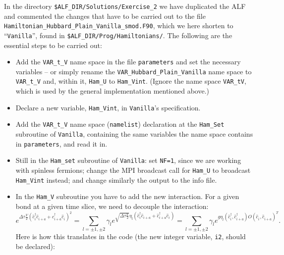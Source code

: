 \documentclass[10pt,modern]{scrartcl}
\numberwithin{exerciseitem}{exercise} %
\begin{document}
In the directory  \texttt{\$ALF\_DIR/Solutions/Exercise\_2} we have  duplicated the ALF and commented  the changes that have to be carried out to the file \texttt{Hamiltonian\_Hubbard\_Plain\_Vanilla\_smod.F90}, which we here shorten to ``\texttt{Vanilla}'', found in \texttt{\$ALF\_DIR/Prog/Hamiltonians/}. The following are the essential steps to be carried out:
\begin{itemize}
\item  Add the \texttt{VAR\_t\_V} name space in the file \texttt{parameters} and set the necessary variables -- or simply rename the \texttt{VAR\_Hubbard\_Plain\_Vanilla} name space to \texttt{VAR\_t\_V} and, within it, \texttt{Ham\_U} to \texttt{Ham\_Vint}. (Ignore the name space \texttt{VAR\_tV}, which is used by the general implementation mentioned above.)
\item  Declare a new variable, \texttt{Ham\_Vint}, in \texttt{Vanilla}'s specification.
\item Add the \texttt{VAR\_t\_V} name space (\texttt{namelist}) declaration at the \texttt{Ham\_Set} subroutine of \texttt{Vanilla}, containing the same variables the name space contains in \texttt{parameters}, and read it in.
\item  Still in the  \texttt{Ham\_set} subroutine of \texttt{Vanilla}: set \texttt{NF=1}, since we are working with spinless fermions; change the MPI broadcast call for \texttt{Ham\_U} to broadcast \texttt{Ham\_Vint} instead; and change similarly the output to the info file.
\item  In the \texttt{Ham\_V} subroutine you have to add the new interaction. For a given bond at a given time slice, we need to decouple the interaction: 
\begin{equation}
e^{\Delta \tau \frac{V}{2} \left( \hat{c}^{\dagger}_{i}  \hat{c}^{\phantom\dagger}_{i+a}      + \hat{c}^{\dagger}_{i+a}  \hat{c}^{\phantom\dagger}_{i} \right)^2} = 
\sum_{l= \pm1, \pm 2} \gamma_l e^{ \sqrt{\Delta \tau \frac{V}{2}}  \eta_l   \left( \hat{c}^{\dagger}_{i}  \hat{c}^{\phantom\dagger}_{i+a}      + \hat{c}^{\dagger}_{i+a}  \hat{c}^{\phantom\dagger}_{i} \right) } =  \sum_{l= \pm1, \pm 2} \gamma_l e^{ g  \eta_l   \left( \hat{c}^{\dagger}_{i},  \hat{c}^{\dagger}_{i+a}  \right)  O 
    \left(\hat{c}^{\phantom\dagger}_{i},  \hat{c}^{\phantom\dagger}_{i+a} \right)^{T} }.
\end{equation}
 Here is  how this translates in the code (the new integer variable, \texttt{i2}, should be declared): 
 

\end{itemize}
\end{document}
